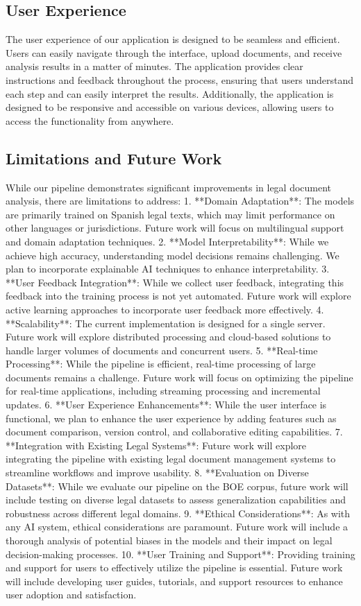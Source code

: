 \documentclass[conference]{IEEEtran}
\begin{document}
\subsection{User Experience}
The user experience of our application is designed to be seamless and efficient. Users can easily navigate through the interface, upload documents, and receive analysis results in a matter of minutes. The application provides clear instructions and feedback throughout the process, ensuring that users understand each step and can easily interpret the results. Additionally, the application is designed to be responsive and accessible on various devices, allowing users to access the functionality from anywhere.
\subsection{Limitations and Future Work}
While our pipeline demonstrates significant improvements in legal document analysis, there are limitations to address:
1. **Domain Adaptation**: The models are primarily trained on Spanish legal texts, which may limit performance on other languages or jurisdictions. Future work will focus on multilingual support and domain adaptation techniques.
2. **Model Interpretability**: While we achieve high accuracy, understanding model decisions remains challenging. We plan to incorporate explainable AI techniques to enhance interpretability.
3. **User Feedback Integration**: While we collect user feedback, integrating this feedback into the training process is not yet automated. Future work will explore active learning approaches to incorporate user feedback more effectively.
4. **Scalability**: The current implementation is designed for a single server. Future work will explore distributed processing and cloud-based solutions to handle larger volumes of documents and concurrent users.
5. **Real-time Processing**: While the pipeline is efficient, real-time processing of large documents remains a challenge. Future work will focus on optimizing the pipeline for real-time applications, including streaming processing and incremental updates.
6. **User Experience Enhancements**: While the user interface is functional, we plan to enhance the user experience by adding features such as document comparison, version control, and collaborative editing capabilities.
7. **Integration with Existing Legal Systems**: Future work will explore integrating the pipeline with existing legal document management systems to streamline workflows and improve usability.
8. **Evaluation on Diverse Datasets**: While we evaluate our pipeline on the BOE corpus, future work will include testing on diverse legal datasets to assess generalization capabilities and robustness across different legal domains.
9. **Ethical Considerations**: As with any AI system, ethical considerations are paramount. Future work will include a thorough analysis of potential biases in the models and their impact on legal decision-making processes.
10. **User Training and Support**: Providing training and support for users to effectively utilize the pipeline is essential. Future work will include developing user guides, tutorials, and support resources to enhance user adoption and satisfaction.
\end{document}
